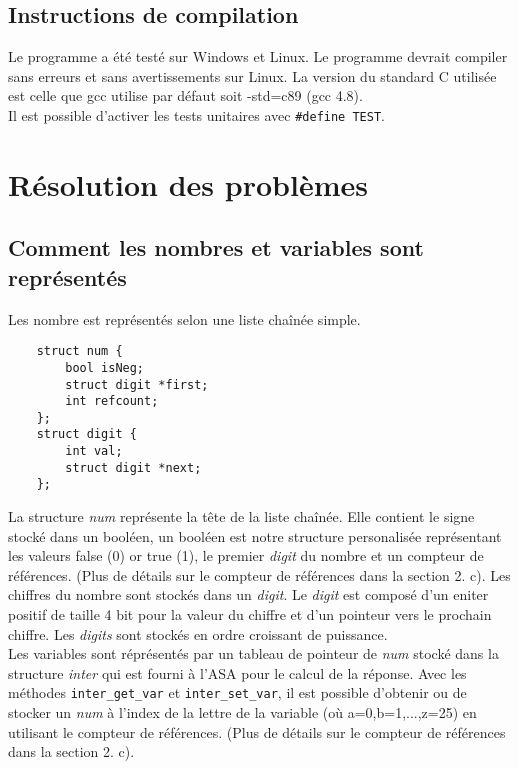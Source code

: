 \documentclass[a4paper,12pt,french]{article}
\begin{document}
	\subsection{Instructions de compilation}
	Le programme a été testé sur Windows et Linux. Le programme devrait compiler
	sans erreurs et sans avertissements sur Linux. La version du standard C
	utilisée est celle que gcc utilise par défaut soit -std=c89 (gcc 4.8).\\

	Il est possible d'activer les tests unitaires avec \lstinline$#define TEST$.
	\newpage
\section{Résolution des problèmes}
	\renewcommand{\thesubsection}{(\alph{subsection})}

	\subsection{Comment les nombres et variables sont représentés}
		Les nombre est représentés selon une liste chaînée simple.
\begin{lstlisting}
	struct num {
	    bool isNeg;
	    struct digit *first;
	    int refcount;
	};
	struct digit {
	    int val;
	    struct digit *next;
	};
\end{lstlisting}
		La structure \textit{num} représente la tête de la liste chaînée. Elle contient le signe stocké dans un booléen, un booléen est notre structure personalisée représentant les valeurs \og false \fg{}(0) or \og true \fg{}(1), le premier \textit{digit} du nombre et un compteur de références. (Plus de détails sur le compteur de références dans la section 2. c). Les chiffres du nombre sont stockés dans un \textit{digit}. Le \textit{digit} est composé d'un eniter positif de taille 4 bit pour la valeur du chiffre et d'un pointeur vers le prochain chiffre. Les \textit{digits} sont stockés en ordre croissant de puissance.\\

		Les variables sont réprésentés par un tableau de pointeur de \textit{num} stocké dans la structure \textit{inter} qui est fourni à l'ASA pour le calcul de la réponse. Avec les méthodes \lstinline$inter_get_var$ et \lstinline$inter_set_var$, il est possible d'obtenir ou de stocker un \textit{num} à l'index de la lettre de la variable (où a=0,b=1,...,z=25)  en utilisant le compteur de références. (Plus de détails sur le compteur de références dans la section 2. c).
\end{document}
